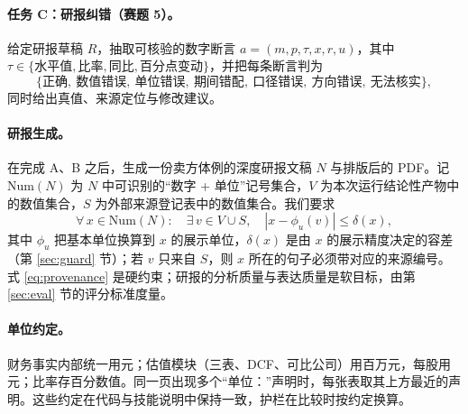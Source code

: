 \paragraph{任务 C：研报纠错（赛题 5）。}给定研报草稿 $R$，抽取可核验的数字断言 $a=(m,p,\tau,x,r,u)$，其中 $\tau\in\{\text{水平值},\text{比率},\text{同比},\text{百分点变动}\}$，并把每条断言判为
\[
  \{\text{正确},\ \text{数值错误},\ \text{单位错误},\ \text{期间错配},\ \text{口径错误},\ \text{方向错误},\ \text{无法核实}\},
\]
同时给出真值、来源定位与修改建议。

\paragraph{研报生成。}在完成 A、B 之后，生成一份卖方体例的深度研报文稿 $N$ 与排版后的 PDF。记 $\mathrm{Num}(N)$ 为 $N$ 中可识别的“数字 + 单位”记号集合，$V$ 为本次运行结论性产物中的数值集合，$S$ 为外部来源登记表中的数值集合。我们要求
\begin{equation}
  \forall\, x\in \mathrm{Num}(N):\quad \exists\, v\in V\cup S,\quad |x - \phi_u(v)| \le \delta(x),
  \label{eq:provenance}
\end{equation}
其中 $\phi_u$ 把基本单位换算到 $x$ 的展示单位，$\delta(x)$ 是由 $x$ 的展示精度决定的容差（第 \ref{sec:guard} 节）；若 $v$ 只来自 $S$，则 $x$ 所在的句子必须带对应的来源编号。式 \eqref{eq:provenance} 是硬约束；研报的分析质量与表达质量是软目标，由第 \ref{sec:eval} 节的评分标准度量。

\paragraph{单位约定。}财务事实内部统一用元；估值模块（三表、DCF、可比公司）用百万元，每股用元；比率存百分数值。同一页出现多个“单位：”声明时，每张表取其上方最近的声明。这些约定在代码与技能说明中保持一致，护栏在比较时按约定换算。
